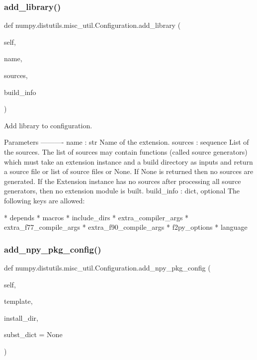 \subsubsection{\texorpdfstring{add\+\_\+library()}{add\_library()}}
{\footnotesize\ttfamily def numpy.\+distutils.\+misc\+\_\+util.\+Configuration.\+add\+\_\+library (\begin{DoxyParamCaption}\item[{}]{self,  }\item[{}]{name,  }\item[{}]{sources,  }\item[{}]{build\+\_\+info }\end{DoxyParamCaption})}

\begin{DoxyVerb}Add library to configuration.

Parameters
----------
name : str
    Name of the extension.
sources : sequence
    List of the sources. The list of sources may contain functions
    (called source generators) which must take an extension instance
    and a build directory as inputs and return a source file or list of
    source files or None. If None is returned then no sources are
    generated. If the Extension instance has no sources after
    processing all source generators, then no extension module is
    built.
build_info : dict, optional
    The following keys are allowed:

* depends
* macros
* include_dirs
* extra_compiler_args
* extra_f77_compile_args
* extra_f90_compile_args
* f2py_options
* language\end{DoxyVerb}
 \mbox{\label{classnumpy_1_1distutils_1_1misc__util_1_1Configuration_ac19bb7c78989483f4e9e7e65027c0af1}} 
\subsubsection{\texorpdfstring{add\+\_\+npy\+\_\+pkg\+\_\+config()}{add\_npy\_pkg\_config()}}
{\footnotesize\ttfamily def numpy.\+distutils.\+misc\+\_\+util.\+Configuration.\+add\+\_\+npy\+\_\+pkg\+\_\+config (\begin{DoxyParamCaption}\item[{}]{self,  }\item[{}]{template,  }\item[{}]{install\+\_\+dir,  }\item[{}]{subst\+\_\+dict = {\ttfamily None} }\end{DoxyParamCaption})}

